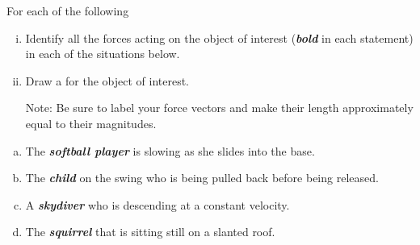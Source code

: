 \label{fnt8.1.1-4}

For each of the following
\begin{enumerate}[(i)]
	\item Identify all the forces acting on the object of interest (\textbf{\em bold} in each statement) in each of the situations below.
	
	\item Draw a \forcediag{} for the object of interest.
	
	Note: Be sure to label your force vectors and make their length approximately equal to their magnitudes.
\end{enumerate}

\begin{enumerate}[(a)]
	\item The \textbf{\em softball player} is slowing as she slides into the base.
	\item The \textbf{\em child} on the swing who is being pulled back before being released.
	\item A \textbf{\em skydiver} who is descending at a constant velocity.
	\item The \textbf{\em squirrel} that is sitting still on a slanted roof.
\end{enumerate}